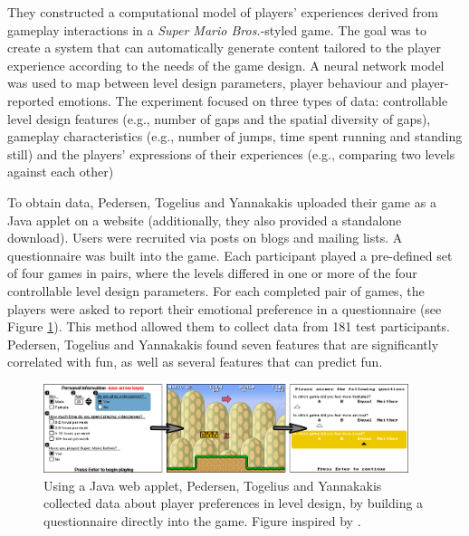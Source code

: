 They constructed a computational model of players' experiences derived from gameplay interactions in a \textit{Super Mario Bros.}-styled game. The goal was to create a system that can automatically generate content tailored to the player experience according to the needs of the game design. A neural network model was used to map between level design parameters, player behaviour and player-reported emotions. The experiment focused on three types of data: controllable level design features (e.g., number of gaps and the spatial diversity of gaps), gameplay characteristics (e.g., number of jumps, time spent running and standing still) and the players' expressions of their experiences (e.g., comparing two levels against each other)

To obtain data, Pedersen, Togelius and Yannakakis uploaded their game as a Java applet on a website (additionally, they also provided a standalone download). Users were recruited via posts on blogs and mailing lists. A questionnaire was built into the game. Each participant played a pre-defined set of four games in pairs, where the levels differed in one or more of the four controllable level design parameters. For each completed pair of games, the players were asked to report their emotional preference in a questionnaire (see Figure \ref{fig:mario}). This method allowed them to collect data from 181 test participants. Pedersen, Togelius and Yannakakis found seven features that are significantly correlated with fun, as well as several features that can predict fun.


\begin{figure}[htbp]
\centering
\includegraphics[width=0.95\textwidth]{Pics/mario_all2}
\caption{Using a Java web applet, Pedersen, Togelius and Yannakakis collected data about player preferences in level design, by building a questionnaire directly into the game. Figure inspired by \cite{marioModel}.}
\label{fig:mario}
\end{figure}